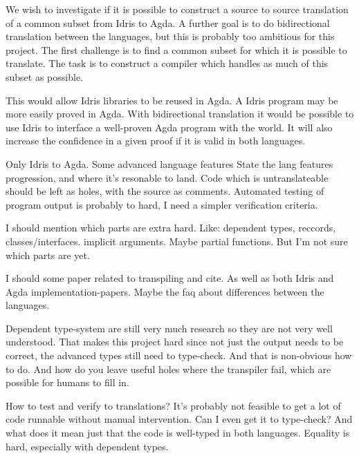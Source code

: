 \documentclass{scrartcl}
\begin{document}
We wish to investigate if it is possible to construct a source to source
translation of a common subset from Idris to Agda.  A further goal is to do
bidirectional translation between the languages, but this is probably too
ambitious for this project.  The first challenge is to find a common subset for
which it is possible to translate. The task is to construct a compiler which
handles as much of this subset as possible.

This would allow Idris libraries to be reused in Agda. A Idris program may be
more easily proved in Agda. With bidirectional translation it would be possible
to use Idris to interface a well-proven Agda program with the world.  It will
also increase the confidence in a given proof if it is valid in both languages.

Only Idris to Agda. Some advanced language features State the lang features
progression, and where it's resonable to land.  Code which is untranslateable
should be left as holes, with the source as comments.
Automated testing of program output is probably to hard, I need a simpler
verification criteria.


I should mention which parts are extra hard. Like: dependent types, reccords,
classes/interfaces. implicit arguments. Maybe partial functions. But I'm not
sure which parts are yet.

I should some paper related to transpiling and cite. As well as both Idris and
Agda implementation-papers. Maybe the faq about differences between the
languages.

Dependent type-system are still very much research so they are not
very well understood. That makes this project hard since not just the output
needs to be correct, the advanced types still need to type-check. And that is
non-obvious how to do. And how do you leave useful holes where the transpiler
fail, which are possible for humans to fill in.

How to test and verify to translations? It's probably not feasible to get a lot
of code runnable without manual intervention. Can I even get it to type-check?
And what does it mean just that the code is well-typed in both languages.
Equality is hard, especially with dependent types.
\end{document}
